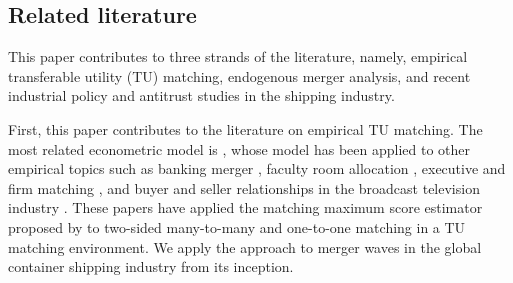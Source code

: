 \documentclass[10pt]{article}
\begin{document}
\subsection{Related literature}

This paper contributes to three strands of the literature, namely, empirical transferable utility (TU) matching, endogenous merger analysis, and recent industrial policy and antitrust studies in the shipping industry.

First, this paper contributes to the literature on empirical TU matching. 
The most related econometric model is \cite{fox2018qe}, whose model has been applied to other empirical topics such as banking merger \citep{akkus2015ms,chen2013ijio}, faculty room allocation \citep{baccara2012aer}, executive and firm matching \citep{pan2017determinants}, and buyer and seller relationships in the broadcast television industry \citep{stahl2016aer}. 
These papers have applied the matching maximum score estimator proposed by \cite{fox2010qe,fox2018qe} to two-sided many-to-many and one-to-one matching in a TU matching environment. 
We apply the approach to merger waves in the global container shipping industry from its inception.
\end{document}
